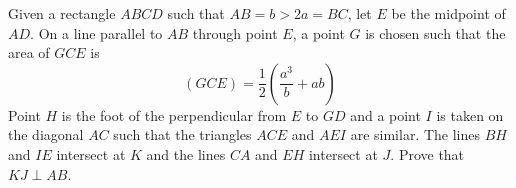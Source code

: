 Given a rectangle $ABCD$ such that $AB = b > 2a = BC$,  let $E$ be the midpoint of $AD$. On a line parallel to $AB$ through point $E$,  a point $G$ is chosen such that the area of $GCE$ is$$(GCE)= \frac12 \left(\frac{a^3}{b}+ab\right)$$Point $H$ is the foot of the perpendicular from $E$ to $GD$ and a point $I$ is taken on the diagonal $AC$ such that the triangles $ACE$ and $AEI$ are similar. The lines $BH$ and $IE$ intersect at $K$ and the lines $CA$ and $EH$ intersect at $J$. Prove that $KJ \perp AB$.